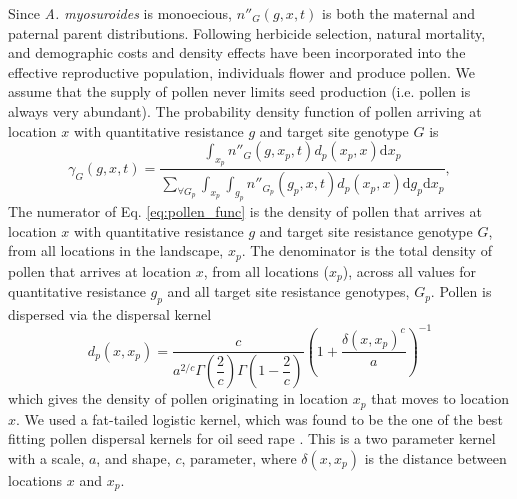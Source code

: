 \documentclass[12pt,a4paper]{article}
\begin{document}
Since \textit{A. myosuroides} is monoecious, $n''_G(g, x, t)$ is both the maternal and paternal parent distributions. Following herbicide selection, natural mortality, and demographic costs and density effects have been incorporated into the effective reproductive population, individuals flower and produce pollen. We assume that the supply of pollen never limits seed production (i.e. pollen is always very abundant). The probability density function of pollen arriving at location $x$ with quantitative resistance $g$ and target site genotype $G$ is 
\begin{equation}\label{eq:pollen_func}
\gamma_G(g, x, t) = \frac{\int_{x_p} n''_G(g, x_p, t)d_p(x_p, x)\text{d}x_p} {\sum_{\forall G_p}\int_{x_p}\int_{g_p} n''_{G_p}(g_p, x, t) d_p(x_p, x)\text{d}g_p \text{d}x_p}, 
\end{equation}
The numerator of Eq. \ref{eq:pollen_func} is the density of pollen that arrives at location $x$ with quantitative resistance $g$ and target site resistance genotype $G$, from all locations in the landscape, $x_p$. The denominator is the total density of pollen that arrives at location $x$, from all locations ($x_p$), across all values for quantitative resistance $g_p$ and all target site resistance genotypes, $G_p$. Pollen is dispersed via the dispersal kernel  
\begin{equation}\label{eq:pollen_disp}
	d_p(x, x_p) = \frac{c}{a^{2/c}\Gamma\left(\dfrac{2}{c} \right)\Gamma\left(1 - \dfrac{2}{c} \right)}{\left( 1 + \dfrac{\delta(x, x_p)^c}{a} \right)}^{-1} 
\end{equation} 
which gives the density of pollen originating in location $x_p$ that moves to location $x$. We used a fat-tailed logistic kernel, which was found to be the one of the best fitting pollen dispersal kernels for oil seed rape \cite{Klei2006}. This is a two parameter kernel with a scale, $a$, and shape, $c$, parameter, where $\delta(x,x_p)$ is the distance between locations $x$ and $x_p$. 
\end{document}
